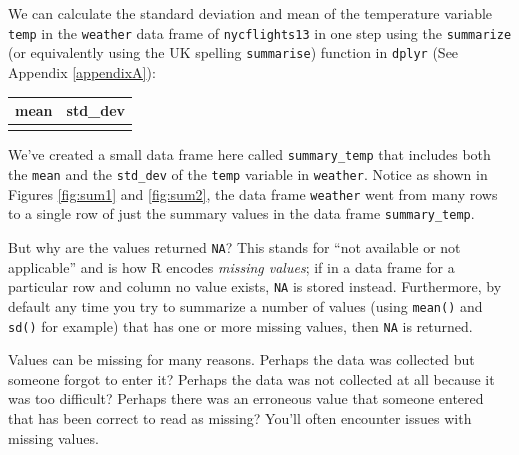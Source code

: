 \documentclass[12pt,]{krantz}
\makeatletter
\newenvironment{Shaded}{\begin{snugshade}}{\end{snugshade}}
\newcommand{\KeywordTok}[1]{\textcolor[rgb]{0.27,0.27,0.27}{\textbf{#1}}}
\newcommand{\DataTypeTok}[1]{\textcolor[rgb]{0.27,0.27,0.27}{#1}}
\newcommand{\StringTok}[1]{\textcolor[rgb]{0.5,0.5,0.5}{#1}}
\newcommand{\OperatorTok}[1]{\textcolor[rgb]{0.43,0.43,0.43}{\textbf{#1}}}
\newcommand{\NormalTok}[1]{#1}
\newenvironment{kframe}{%
\medskip{}
\setlength{\fboxsep}{.8em}
 \def\at@end@of@kframe{}%
 \ifinner\ifhmode%
  \def\at@end@of@kframe{\end{minipage}}%
  \begin{minipage}{\columnwidth}%
 \fi\fi%
 \def\FrameCommand##1{\hskip\@totalleftmargin \hskip-\fboxsep
 \colorbox{shadecolor}{##1}\hskip-\fboxsep
     \hskip-\linewidth \hskip-\@totalleftmargin \hskip\columnwidth}%
 \MakeFramed {\advance\hsize-\width
   \@totalleftmargin\z@ \linewidth\hsize
   \@setminipage}}%
 {\par\unskip\endMakeFramed%
 \at@end@of@kframe}
\renewenvironment{Shaded}{\begin{kframe}}{\end{kframe}}
\theoremstyle{definition}
\theoremstyle{definition}
\theoremstyle{definition}
\theoremstyle{remark}
\makeatother
\begin{document}
We can calculate the standard deviation and mean of the temperature
variable \texttt{temp} in the \texttt{weather} data frame of
\texttt{nycflights13} in one step using the \texttt{summarize} (or
equivalently using the UK spelling \texttt{summarise}) function in
\texttt{dplyr} (See Appendix \ref{appendixA}):

\begin{Shaded}
\end{Shaded}

\begin{table}[H]
\centering\begingroup\fontsize{10}{12}\selectfont

\begin{tabular}{r|r}
\hline
mean & std\_dev\\
\hline
 & \\
\hline
\end{tabular}
\endgroup{}
\end{table}

We've created a small data frame here called \texttt{summary\_temp} that
includes both the \texttt{mean} and the \texttt{std\_dev} of the
\texttt{temp} variable in \texttt{weather}. Notice as shown in Figures
\ref{fig:sum1} and \ref{fig:sum2}, the data frame \texttt{weather} went
from many rows to a single row of just the summary values in the data
frame \texttt{summary\_temp}.

But why are the values returned \texttt{NA}? This stands for ``not
available or not applicable'' and is how R encodes \emph{missing
values}; if in a data frame for a particular row and column no value
exists, \texttt{NA} is stored instead. Furthermore, by default any time
you try to summarize a number of values (using \texttt{mean()} and
\texttt{sd()} for example) that has one or more missing values, then
\texttt{NA} is returned.

Values can be missing for many reasons. Perhaps the data was collected
but someone forgot to enter it? Perhaps the data was not collected at
all because it was too difficult? Perhaps there was an erroneous value
that someone entered that has been correct to read as missing? You'll
often encounter issues with missing values.
\end{document}
